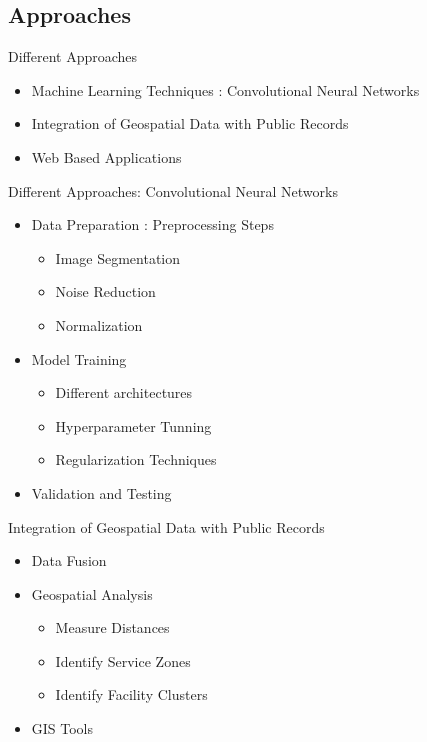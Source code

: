 \documentclass{beamer}
\begin{document}
\subsection{Approaches}
\begin{frame}{Different Approaches}
    \begin{itemize}
        \item{Machine Learning Techniques : Convolutional Neural Networks}
        \item{Integration of Geospatial Data with Public Records}
        \item{Web Based Applications}
    \end{itemize}
\end{frame}

\begin{frame}{Different Approaches: Convolutional Neural Networks}
    \begin{itemize}
        \item{Data Preparation : Preprocessing Steps}
        \begin{itemize}
        \item{Image Segmentation}
        \item{Noise Reduction}
        \item{Normalization}
        \end{itemize}
        \item{Model Training }
        \begin{itemize}
        \item{Different architectures}
        \item{Hyperparameter Tunning}
        \item{Regularization Techniques}
        \end{itemize}
        \item{Validation and Testing}
    \end{itemize}
\end{frame}

\begin{frame}{Integration of Geospatial Data with Public Records}
    \begin{itemize}
        \item{Data Fusion}
        \item{Geospatial Analysis }
        \begin{itemize}
        \item{Measure Distances}
        \item{Identify Service Zones}
        \item{Identify Facility Clusters }
        \end{itemize}
        \item{GIS Tools}
    \end{itemize}
\end{frame}
\end{document}
